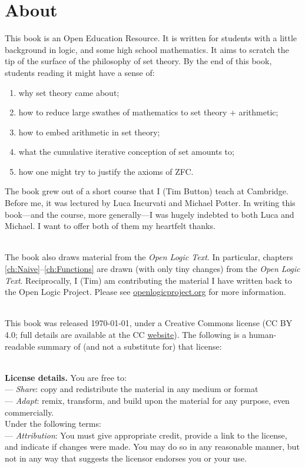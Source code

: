 \chapter*{About}
This book is an Open Education Resource. It is written for students with a little background in logic, and some high school mathematics. It aims to scratch the tip of the surface of the philosophy of set theory. By the end of this book, students reading it might have a sense of:
\begin{enumerate}
	\item why set theory came about; 
	\item how to reduce large swathes of mathematics to set theory + arithmetic;
	\item how to embed arithmetic in set theory;
	\item what the cumulative iterative conception of set amounts to;
	\item how one might try to justify the axioms of ZFC.
\end{enumerate}
The book grew out of a short course that I (Tim Button) teach at Cambridge. Before me, it was lectured by Luca Incurvati and Michael Potter. In writing this book---and the course, more generally---I was hugely indebted to both Luca and Michael. I want to offer both of them my heartfelt thanks.

\
\\
The book also draws material from the \textit{Open Logic Text}. In particular, chapters \ref{ch:Naive}--\ref{ch:Functions} are drawn (with only tiny changes) from the \emph{Open Logic Text}. Reciprocally, I (Tim) am contributing the material I have written back to the Open Logic Project. Please see 
\href{http://openlogicproject.org/}{openlogicproject.org} for
more information. 

\
\\This book was released \today, under a Creative Commons license (CC BY 4.0; full details are available at the CC \href{http://creativecommons.org/licenses/by/4.0/}{website}). The following is a human-readable summary of (and not a substitute for) that license:

\
\\
{\footnotesize \textbf{License details.} You are free to:\\
	--- \emph{Share}: copy and redistribute the material in any medium or format\\
	--- \emph{Adapt}: remix, transform, and build upon the material
	for any purpose, even commercially.
	\\Under the following terms:\\
	--- \emph{Attribution}: You must give appropriate credit, provide a link to the license, and indicate if changes were made. You may do so in any reasonable manner, but not in any way that suggests the licensor endorses you or your use.}